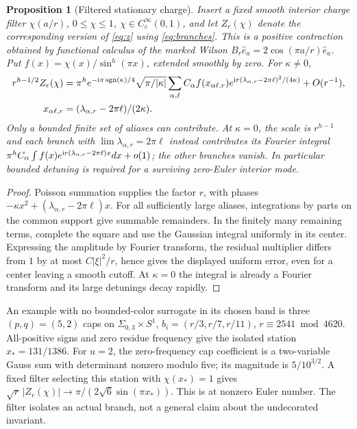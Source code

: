 \documentclass[11pt]{article}
\newtheorem{proposition}[theorem]{Proposition}
\newcommand\ii{{\rm i}}
\newcommand\sgn{\operatorname{sgn}}
\begin{document}
\begin{proposition}[Filtered stationary charge]\label{prop:bulk}
Insert a fixed smooth interior charge filter \(\chi(a/r)\), \(0\le\chi\le1\), \(\chi\in C_c^\infty(0,1)\), and let \(Z_r(\chi)\) denote the corresponding version of \eqref{eq:z} using \eqref{eq:branches}. This is a positive contraction obtained by functional calculus of the marked Wilson \(B_r\hat e_a=2\cos(\pi a/r)\hat e_a\). Put \(f(x)=\chi(x)/\sin^h(\pi x)\), extended smoothly by zero. For \(\kappa\ne0\),
\begin{align}
r^{h-1/2}Z_r(\chi)
&=\pi^h e^{-\ii\pi\sgn(\kappa)/4}\sqrt{\pi/|\kappa|}
  \sum_{\alpha,\ell} C_\alpha f(x_{\alpha\ell,r})
         e^{\ii r(\lambda_{\alpha,r}-2\pi\ell)^2/(4\kappa)}
    +O(r^{-1}),\label{eq:stat}\\
x_{\alpha\ell,r}&=(\lambda_{\alpha,r}-2\pi\ell)/(2\kappa).\nonumber
\end{align}
Only a bounded finite set of aliases can contribute. At \(\kappa=0\), the scale is \(r^{h-1}\) and each branch with \(\lim\lambda_{\alpha,r}=2\pi\ell\) instead contributes its Fourier integral \(\pi^h C_\alpha\int f(x)e^{\ii r(\lambda_{\alpha,r}-2\pi\ell)x}dx+o(1)\); the other branches vanish. In particular bounded detuning is required for a surviving zero-Euler interior mode.
\end{proposition}

\begin{proof}
Poisson summation supplies the factor \(r\), with phases \(-\kappa x^2+(\lambda_{\alpha,r}-2\pi\ell)x\). For all sufficiently large aliases, integrations by parts on the common support give summable remainders. In the finitely many remaining terms, complete the square and use the Gaussian integral uniformly in its center. Expressing the amplitude by Fourier transform, the residual multiplier differs from \(1\) by at most \(C|\xi|^2/r\), hence gives the displayed uniform error, even for a center leaving a smooth cutoff. At \(\kappa=0\) the integral is already a Fourier transform and its large detunings decay rapidly.
\end{proof}

An example with no bounded-color surrogate in its chosen band is three \((p,q)=(5,2)\) caps on \(\Sigma_{0,3}\times S^1\), \(b_i=(r/3,r/7,r/11)\), \(r\equiv2541\bmod4620\). All-positive signs and zero residue frequency give the isolated station \(x_*=131/1386\). For \(u=2\), the zero-frequency cap coefficient is a two-variable Gauss sum with determinant nonzero modulo five; its magnitude is \(5/10^{3/2}\). A fixed filter selecting this station with \(\chi(x_*)=1\) gives \(\sqrt r\,|Z_r(\chi)|\to\pi/(2\sqrt6\sin(\pi x_*))\). This is at nonzero Euler number. The filter isolates an actual branch, not a general claim about the undecorated invariant.
\end{document}

